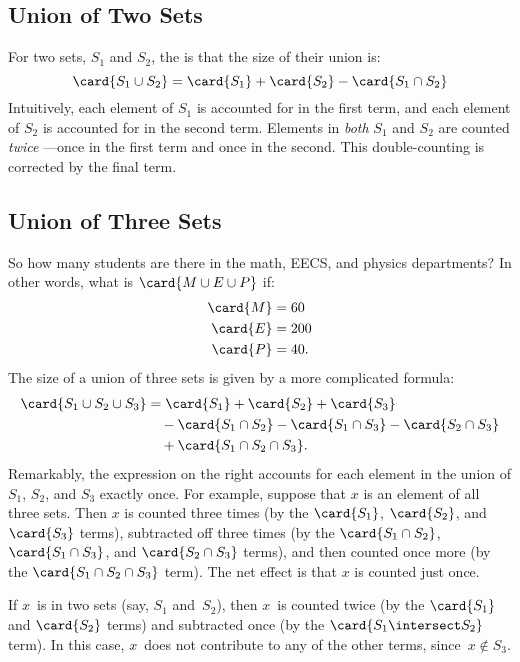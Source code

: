 \subsection{Union of Two Sets}

For two sets, $S_1$ and $S_2$, the  is that the
size of their union is:
\begin{equation}\label{IE2}
\card{S_1 \cup S_2} = \card{S_1} + \card{S_2} - \card{S_1 \cap S_2}
\end{equation}
Intuitively, each element of $S_1$ is accounted for in the first term,
and each element of $S_2$ is accounted for in the second term.
Elements in \emph{both} $S_1$ and $S_2$ are counted
\emph{twice} ---once in the first term and once in the second.  This
double-counting is corrected by the final term.

\subsection{Union of Three Sets}

So how many students are there in the math, EECS, and physics
departments?  In other words, what is $\card{M \cup E \cup P}$ if:
%
\begin{align*}
\card{M} & = 60 \\
\card{E} & = 200 \\
\card{P} & = 40.
\end{align*}
%
The size of a union of three sets is given by a more complicated
 formula:
%
\begin{align*}
\card{S_1 \cup S_2 \cup S_3} & = \card{S_1} + \card{S_2} + \card{S_3} \\
  & \quad - \card{S_1 \cap S_2} - \card{S_1 \cap S_3} - \card{S_2 \cap S_3} \\
  & \quad + \card{S_1 \cap S_2 \cap S_3}.
\end{align*}
%
Remarkably, the expression on the right accounts for each element in the
union of $S_1$, $S_2$, and $S_3$ exactly once.  For example, suppose that
$x$ is an element of all three sets.  Then $x$ is counted three times (by
the $\card{S_1}$, $\card{S_2}$, and $\card{S_3}$ terms), subtracted off
three times (by the $\card{S_1 \cap S_2}$, $\card{S_1 \cap S_3}$, and
$\card{S_2 \cap S_3}$ terms), and then counted once more (by the
$\card{S_1 \cap S_2 \cap S_3}$ term).  The net effect is that $x$ is
counted just once.

If $x$~is in two sets (say, $S_1$ and~$S_2$), then $x$~is counted
twice (by the $\card{S_1}$ and $\card{S_2}$ terms) and subtracted once
(by the $\card{S_1 \intersect S_2}$ term).  In this case, $x$~does not
contribute to any of the other terms, since~$x \notin S_3$.

